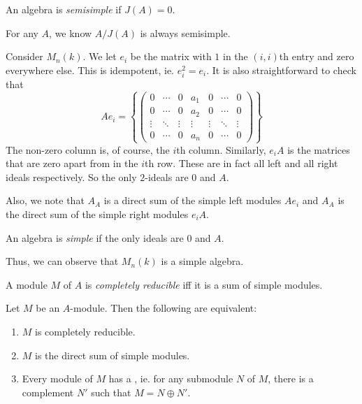 \documentclass[a4paper]{article}
\begin{document}
\begin{defi}
  An algebra is \emph{semisimple} if $J(A) = 0$.
\end{defi}

\begin{eg}
  For any $A$, we know $A/J(A)$ is always semisimple.
\end{eg}

\begin{eg}
  Consider $M_n(k)$. We let $e_i$ be the matrix with $1$ in the $(i, i)$th entry and zero everywhere else. This is idempotent, ie. $e_i^2 = e_i$. It is also straightforward to check that
  \[
    A e_i =
    \left\{
      \begin{pmatrix}
        0 & \cdots & 0 & a_1 & 0 & \cdots & 0\\
        0 & \cdots & 0 & a_2 & 0 & \cdots & 0\\
        \vdots & \ddots & \vdots & \vdots & \vdots & \ddots & \vdots\\
        0 & \cdots & 0 & a_n & 0 & \cdots & 0
      \end{pmatrix}
    \right\}
  \]
  The non-zero column is, of course, the $i$th column. Similarly, $e_i A$ is the matrices that are zero apart from in the $i$th row. These are in fact all left and all right ideals respectively. So the only $2$-ideals are $0$ and $A$.

  Also, we note that $A_A$ is a direct sum of the simple left modules $A e_i$ and $A_A$ is the direct sum of the simple right modules $e_i A$.
\end{eg}

\begin{defi}
  An algebra is \emph{simple} if the only ideals are $0$ and $A$.
\end{defi}
Thus, we can observe that $M_n(k)$ is a simple algebra.

\begin{defi}
  A module $M$ of $A$ is \emph{completely reducible} iff it is a sum of simple modules.
\end{defi}

\begin{prop}
  Let $M$ be an $A$-module. Then the following are equivalent:
  \begin{enumerate}
    \item $M$ is completely reducible.
    \item $M$ is the direct sum of simple modules.
    \item Every module of $M$ has a , ie. for any submodule $N$ of $M$, there is a complement $N'$ such that $M = N \oplus N'$.
  \end{enumerate}
\end{prop}
\end{document}

